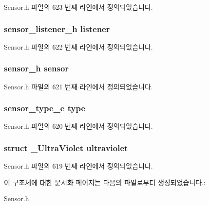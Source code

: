 Sensor.\-h 파일의 623 번째 라인에서 정의되었습니다.

\hypertarget{struct__UltraVioletExtend_aa977dfb866b24fd7d9a20a9a01b2fd1f}{
\subsubsection[{listener}]{\setlength{\rightskip}{0pt plus 5cm}sensor\-\_\-listener\-\_\-h listener}}\label{struct__UltraVioletExtend_aa977dfb866b24fd7d9a20a9a01b2fd1f}


Sensor.\-h 파일의 622 번째 라인에서 정의되었습니다.

\hypertarget{struct__UltraVioletExtend_a5bae9b7801bc3808411925cde81d3f26}{
\subsubsection[{sensor}]{\setlength{\rightskip}{0pt plus 5cm}sensor\-\_\-h sensor}}\label{struct__UltraVioletExtend_a5bae9b7801bc3808411925cde81d3f26}


Sensor.\-h 파일의 621 번째 라인에서 정의되었습니다.

\hypertarget{struct__UltraVioletExtend_abffb09766da2fc510a79bb51f82a36e1}{
\subsubsection[{type}]{\setlength{\rightskip}{0pt plus 5cm}sensor\-\_\-type\-\_\-e type}}\label{struct__UltraVioletExtend_abffb09766da2fc510a79bb51f82a36e1}


Sensor.\-h 파일의 620 번째 라인에서 정의되었습니다.

\hypertarget{struct__UltraVioletExtend_a5ecfbeb3a1030d60f8478b26f0ea7fb0}{
\subsubsection[{ultraviolet}]{\setlength{\rightskip}{0pt plus 5cm}struct {\bf \-\_\-\-Ultra\-Violet} ultraviolet}}\label{struct__UltraVioletExtend_a5ecfbeb3a1030d60f8478b26f0ea7fb0}


Sensor.\-h 파일의 619 번째 라인에서 정의되었습니다.



이 구조체에 대한 문서화 페이지는 다음의 파일로부터 생성되었습니다.\-:\begin{DoxyCompactItemize}
\item 
Sensor.\-h\end{DoxyCompactItemize}
